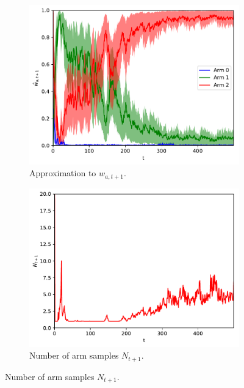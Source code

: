 \documentclass{article}
\begin{document}
\begin{figure}[!h]
	\centering
	\begin{subfigure}[b]{0.33\textwidth}
		\includegraphics[width=\textwidth]{./figs/bernoulli/pred_action_density.pdf}
		\caption{Approximation to $w_{a,t+1}$.}
		\label{fig:pred_action_density}
	\end{subfigure}%
	\begin{subfigure}[b]{0.33\textwidth}
		\includegraphics[width=\textwidth]{./figs/bernoulli/n_samples.pdf}
		\caption{Number of arm samples $N_{t+1}$.}

\end{subfigure}
\end{figure}
\end{document}
